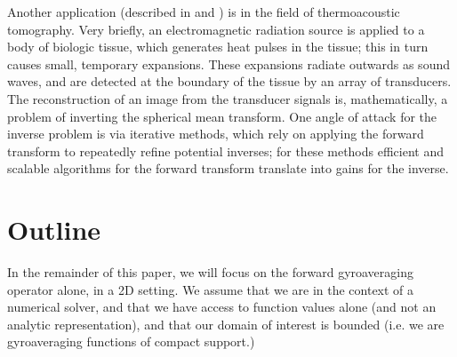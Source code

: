 Another application  (described in \cite{gorner2012} and \cite{gorner2015}) is in the field of thermoacoustic tomography.  Very briefly, an electromagnetic radiation source is applied to a body of biologic tissue, which generates heat pulses in the tissue; this in turn causes small, temporary expansions.  These expansions radiate outwards as sound waves, and are detected at the boundary of the tissue by an array of transducers.  The reconstruction of an image from the transducer signals is, mathematically, a problem of inverting the spherical mean transform.  One angle of attack for the inverse problem is via iterative methods, which rely on applying the forward transform to repeatedly refine potential inverses; for these methods efficient and scalable algorithms for the forward transform translate into gains for the inverse.  




\section{Outline\label{Outline}}
In the remainder of this paper, we will focus on the forward gyroaveraging operator alone, in a 2D setting.  We assume that we are in the context of a numerical solver, and that we have access to function values alone (and not an analytic representation), and that our domain of interest is bounded (i.e. we are gyroaveraging functions of compact support.)  

